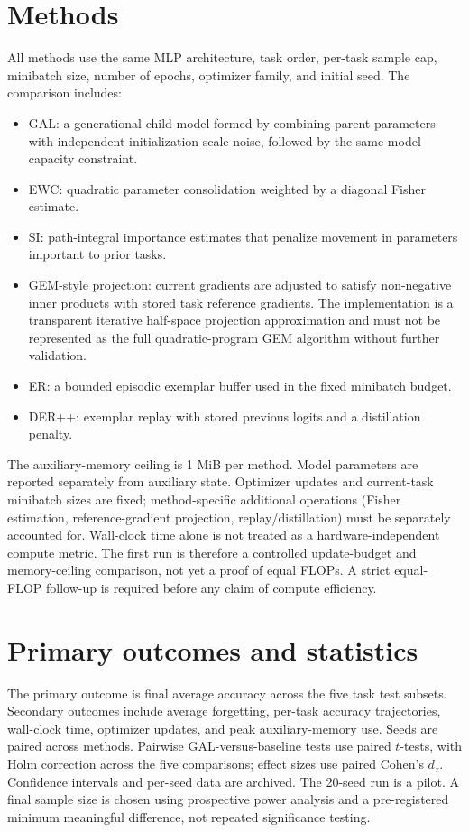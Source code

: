 \documentclass[11pt,a4paper]{article}
\begin{document}
\section{Methods}
All methods use the same MLP architecture, task order, per-task sample cap, minibatch size, number of epochs, optimizer family, and initial seed. The comparison includes:
\begin{itemize}
\item GAL: a generational child model formed by combining parent parameters with independent initialization-scale noise, followed by the same model capacity constraint.
\item EWC: quadratic parameter consolidation weighted by a diagonal Fisher estimate.
\item SI: path-integral importance estimates that penalize movement in parameters important to prior tasks.
\item GEM-style projection: current gradients are adjusted to satisfy non-negative inner products with stored task reference gradients. The implementation is a transparent iterative half-space projection approximation and must not be represented as the full quadratic-program GEM algorithm without further validation.
\item ER: a bounded episodic exemplar buffer used in the fixed minibatch budget.
\item DER++: exemplar replay with stored previous logits and a distillation penalty.
\end{itemize}

The auxiliary-memory ceiling is 1 MiB per method. Model parameters are reported separately from auxiliary state. Optimizer updates and current-task minibatch sizes are fixed; method-specific additional operations (Fisher estimation, reference-gradient projection, replay/distillation) must be separately accounted for. Wall-clock time alone is not treated as a hardware-independent compute metric. The first run is therefore a controlled update-budget and memory-ceiling comparison, not yet a proof of equal FLOPs. A strict equal-FLOP follow-up is required before any claim of compute efficiency.

\section{Primary outcomes and statistics}
The primary outcome is final average accuracy across the five task test subsets. Secondary outcomes include average forgetting, per-task accuracy trajectories, wall-clock time, optimizer updates, and peak auxiliary-memory use. Seeds are paired across methods. Pairwise GAL-versus-baseline tests use paired $t$-tests, with Holm correction across the five comparisons; effect sizes use paired Cohen's $d_z$. Confidence intervals and per-seed data are archived. The 20-seed run is a pilot. A final sample size is chosen using prospective power analysis and a pre-registered minimum meaningful difference, not repeated significance testing.
\end{document}
